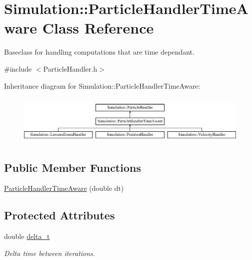 \hypertarget{classSimulation_1_1ParticleHandlerTimeAware}{\section{Simulation\-:\-:Particle\-Handler\-Time\-Aware Class Reference}
\label{classSimulation_1_1ParticleHandlerTimeAware}
}


Baseclass for handling computations that are time dependant.  




{\ttfamily \#include $<$Particle\-Handler.\-h$>$}

Inheritance diagram for Simulation\-:\-:Particle\-Handler\-Time\-Aware\-:\begin{figure}[H]
\begin{center}
\leavevmode
\includegraphics[height=2.393162cm]{classSimulation_1_1ParticleHandlerTimeAware}
\end{center}
\end{figure}
\subsection*{Public Member Functions}
\begin{DoxyCompactItemize}
\item 
\hyperlink{classSimulation_1_1ParticleHandlerTimeAware_a839536b59b78947066e2b9cbf01010fc}{Particle\-Handler\-Time\-Aware} (double dt)
\end{DoxyCompactItemize}
\subsection*{Protected Attributes}
\begin{DoxyCompactItemize}
\item 
double \hyperlink{classSimulation_1_1ParticleHandlerTimeAware_a8c6378b506877c8d69dee8c31f3dfc45}{delta\-\_\-t}
\begin{DoxyCompactList}\small\item\em Delta time between iterations. \end{DoxyCompactList}\end{DoxyCompactItemize}


